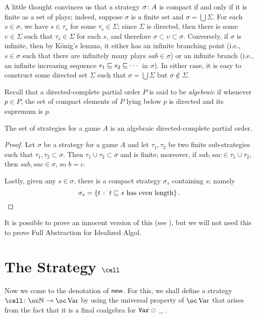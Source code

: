A little thought convinces us that a strategy $\sigma\colon A$ is compact if and only if it is finite as a set of plays; indeed, suppose $\sigma$ is a finite set and $\sigma=\bigcup\Sigma$.  
For each $s\in\sigma$, we have $s\in\tau_s$ for some $\tau_s\in\Sigma$; since $\Sigma$ is directed, then there is some $\upsilon\in\Sigma$ such that $\tau_s\in\Sigma$ for each $s$, and therefore $\sigma\subset\upsilon\subset\sigma$.
Conversely, if $\sigma$ is infinite, then by K\"{o}nig's lemma, it either has an infinite branching point (i.e., $s\in\sigma$ such that there are infinitely many plays $sab\in\sigma$) or an infinite branch (i.e., an infinite increasing sequence $s_1\sqsubseteq s_2\sqsubseteq \cdots$ in $\sigma$).  
In either case, it is easy to construct some directed set $\Sigma$ such that $\sigma=\bigcup\Sigma$ but $\sigma\not\in\Sigma$.

Recall that a directed-complete partial order $P$ is said to be \emph{algebraic} if whenever $p\in P$, the set of compact elements of $P$ lying below $p$ is directed and its supremum is $p$.  

\begin{proposition}
  The set of strategies for a game $A$ is an algebraic directed-complete partial order.
\end{proposition}
\begin{proof}
  Let $\sigma$ be a strategy for a game $A$ and let $\tau_1,\tau_2$ be two finite sub-strategies such that $\tau_1,\tau_2\subset\sigma$.  
  Then $\tau_1\cup\tau_2\subset\sigma$ and is finite; moreover, if $sab,sac\in\tau_1\cup\tau_2$, then $sab,sac\in\sigma$, so $b=c$.  

  Lastly, given any $s\in\sigma$, there is a compact strategy $\sigma_s$ containing $s$; namely
  \[
    \sigma_s = \{t\;\colon\; \text{$t\sqsubseteq s$ has even length}\}\,.\qedhere
    \]
\end{proof}

It is possible to prove an innocent version of this (see \cite{hoPcf}), but we will not need this to prove Full Abstraction for Idealized Algol.

\section{The Strategy $\cell$}
\label{SecCell}

Now we come to the denotation of $\operatorname{{\mathsf{new}}}$.  
For this, we shall define a strategy $\cell\from \oc\bN \implies \oc \Varr$ by using the universal property of $\oc \Varr$ that arises from the fact that it is a final coalgebra for ${\mathtt{Var}} \oslash\,\underline{\hspace{1.5ex}}\,$.

